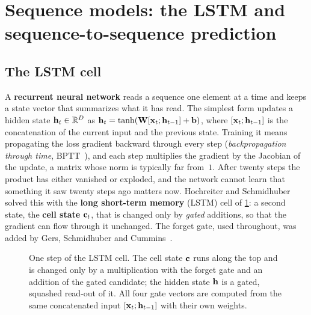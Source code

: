 \section[LSTM and sequence-to-sequence prediction]{Sequence models: the LSTM and sequence-to-sequence prediction}
\label{sec:ch20-lstm}

\subsection{The LSTM cell}
\label{sec:ch20-cell}

A \textbf{recurrent neural network} reads a
sequence one element at a time and keeps a state vector that summarizes what
it has read. The simplest form updates a hidden state $\mathbf{h}_t \in \mathbb{R}^D$ as
$\mathbf{h}_t = \tanh(\mathbf{W}[\mathbf{x}_t; \mathbf{h}_{t-1}] + \mathbf{b})$, where
$[\mathbf{x}_t; \mathbf{h}_{t-1}]$ is the concatenation of the current input and
the previous state. Training it means propagating the loss gradient
backward through every step (\emph{backpropagation through
time}, BPTT~\cite{werbos1990bptt}), and
each step multiplies the gradient by the Jacobian of the update, a matrix
whose norm is typically far from~$1$. After twenty steps the product has
either vanished or exploded, and the network cannot learn that something it
saw twenty steps ago matters now. Hochreiter and
Schmidhuber~\cite{hochreiter1997lstm} solved this with the \textbf{long
short-term memory} (LSTM) cell of
\cref{fig:ch20-lstm-cell}: a second state, the \textbf{cell
state} $\mathbf{c}_t$, that is
changed only by \emph{gated} additions, so that the gradient can flow
through it unchanged. The forget gate, used throughout, was added by Gers,
Schmidhuber and Cummins~\cite{gers2000learning}.

\begin{figure}[tb]
  \centering
  \caption{One step of the LSTM cell. The cell state $\mathbf{c}$ runs along the
  top and is changed only by a multiplication with the forget gate and an
  addition of the gated candidate; the hidden state $\mathbf{h}$ is a gated,
  squashed read-out of it. All four gate vectors are computed from the same
  concatenated input $[\mathbf{x}_t; \mathbf{h}_{t-1}]$ with their own weights.}
  \label{fig:ch20-lstm-cell}
\end{figure}

